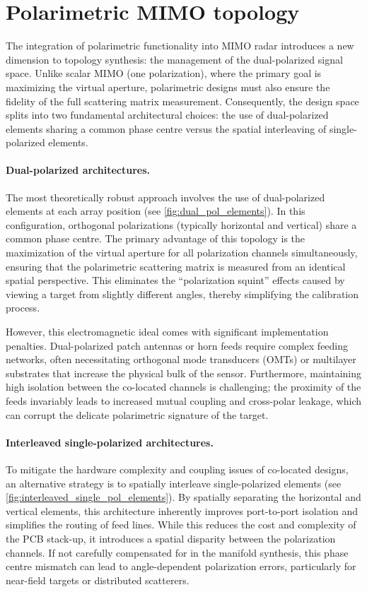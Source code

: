 \section{Polarimetric MIMO topology}

The integration of polarimetric functionality into MIMO radar introduces a new dimension to topology synthesis: the management of the dual-polarized signal space.
Unlike scalar MIMO (one polarization), where the primary goal is maximizing the virtual aperture, polarimetric designs must also ensure the fidelity of the full scattering matrix measurement.
Consequently, the design space splits into two fundamental architectural choices: the use of dual-polarized elements sharing a common phase centre versus the spatial interleaving of single-polarized elements.

\paragraph{Dual-polarized architectures.} The most theoretically robust approach involves the use of dual-polarized elements at each array position (see \cref{fig:dual_pol_elements}).
In this configuration, orthogonal polarizations (typically horizontal and vertical) share a common phase centre.
The primary advantage of this topology is the maximization of the virtual aperture for all polarization channels simultaneously, ensuring that the polarimetric scattering matrix is measured from an identical spatial perspective.
This eliminates the \enquote{polarization squint} effects caused by viewing a target from slightly different angles, thereby simplifying the calibration process.

However, this electromagnetic ideal comes with significant implementation penalties.
Dual-polarized patch antennas or horn feeds require complex feeding networks, often necessitating orthogonal mode transducers (OMTs) or multilayer substrates that increase the physical bulk of the sensor.
Furthermore, maintaining high isolation between the co-located channels is challenging; the proximity of the feeds invariably leads to increased mutual coupling and cross-polar leakage, which can corrupt the delicate polarimetric signature of the target.

\paragraph{Interleaved single-polarized architectures.} To mitigate the hardware complexity and coupling issues of co-located designs, an alternative strategy is to spatially interleave single-polarized elements (see \cref{fig:interleaved_single_pol_elements}).
By spatially separating the horizontal and vertical elements, this architecture inherently improves port-to-port isolation and simplifies the routing of feed lines.
While this reduces the cost and complexity of the PCB stack-up, it introduces a spatial disparity between the polarization channels.
If not carefully compensated for in the manifold synthesis, this phase centre mismatch can lead to angle-dependent polarization errors, particularly for near-field targets or distributed scatterers.

